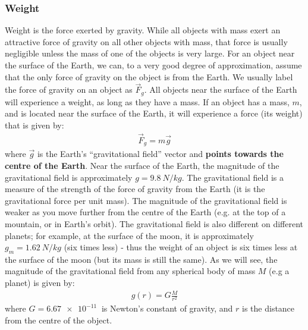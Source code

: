 \subsubsection{Weight}
Weight is the force exerted by gravity. While all objects with mass exert an attractive force of gravity on all other objects with mass, that force is usually negligible unless the mass of one of the objects is very large. For an object near the surface of the Earth, we can, to a very good degree of approximation, assume that the only force of gravity on the object is from the Earth. We usually label the force of gravity on an object as $\vec F_g$. All objects near the surface of the Earth will experience a weight, as long as they have a mass. If an object has a mass, $m$, and is located near the surface of the Earth, it will experience a force (its weight) that is given by:
\begin{align*}
\vec F_g = m\vec g
\end{align*}
where $\vec g$ is the Earth's ``gravitational field'' vector and \textbf{points towards the centre of the Earth}. Near the surface of the Earth, the magnitude of the gravitational field is approximately $g=\SI{9.8}{N/kg}$. The gravitational field is a measure of the strength of the force of gravity from the Earth (it is the gravitational force per unit mass). The magnitude of the gravitational field is weaker as you move further from the centre of the Earth (e.g. at the top of a mountain, or in Earth's orbit). The gravitational field is also different on different planets; for example, at the surface of the moon, it is approximately $g_m=\SI{1.62}{N/kg}$ (six times less) - thus the weight of an object is six times less at the surface of the moon (but its mass is still the same). As we will see, the magnitude of the gravitational field from any spherical body of mass $M$ (e.g a planet) is given by:
\begin{align*}
g(r) = G\frac{M}{r^2}
\end{align*}
where $G=\SI{6.67e-11}{}$ is Newton's constant of gravity, and $r$ is the distance from the centre of the object. 

